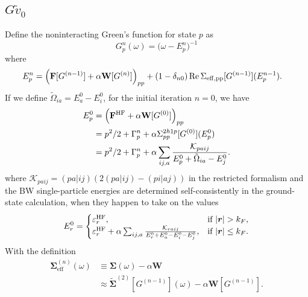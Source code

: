 \subsection{$G\tilde{v}_0$}
Define the noninteracting Green's function for state $p$ as
\begin{equation}
G^{n}_p(\omega)
=
\big( \omega - E^n_p \big)^{-1}
\end{equation}
where%
\begin{align}
    E^n_p &= \left(\mathbf{F}[G^{(n-1)}] + \alpha \mathbf{W}[G^{(n)}] \right)_{pp} + (1-\delta_{n0})\operatorname{Re}\Sigma_{\rm eff,pp}[G^{(n-1)}](E^{n-1}_p).
\end{align}
If we define $\tilde{\Omega}_{ia} = E^0_a - E^0_i$, for the initial iteration $n=0$, we have
\begin{align}
    E^0_p &= \left(\mathbf{F}^{\rm HF} + \alpha \mathbf{W}[G^{(0)}] \right)_{pp}\\
&=  p^2/2 + \Gamma_p^{n}+ \alpha \Sigma^{2h1p}_{pp}[G^{(0)}](E^0_p)\\
&= p^2/2 + \Gamma_p^{n} + \alpha\sum_{ij,a} \frac{\mathcal{K}_{paij}}{E^0_p + \tilde{\Omega}_{ia} - E^0_j}.
\end{align}
where $\mathcal{K}_{paij} = (pa|ij)\left(2(pa|ij)-(pi|aj)\right)$ in the restricted formalism and the BW single-particle energies are determined self-consistently in the ground-state calculation, when they happen to take on the values 
\begin{equation}
    E^0_r = \begin{cases}
\varepsilon^{\rm HF}_r, & \text{if } |\bm{r}| > k_F,\\
\varepsilon^{\rm HF}_r + \alpha\sum_{ij,a} \frac{\mathcal{K}_{raij}}{E^0_r + E^0_a - E^0_i - E^0_j}, & \text{if } |\bm{r}| \leq k_F.
    \end{cases}
\end{equation}
With the definition 
\begin{align}
\bm{\Sigma}^{(n)}_{\mathrm{eff}}(\omega)
&\equiv
\bm{\Sigma}(\omega) - \alpha \mathbf{W} \\
&\approx
\tilde{\bm{\Sigma}}^{(2)}\!\left[ G^{(n-1)} \right](\omega)
- \alpha \mathbf{W}\left[ G^{(n-1)} \right].
\end{align}
